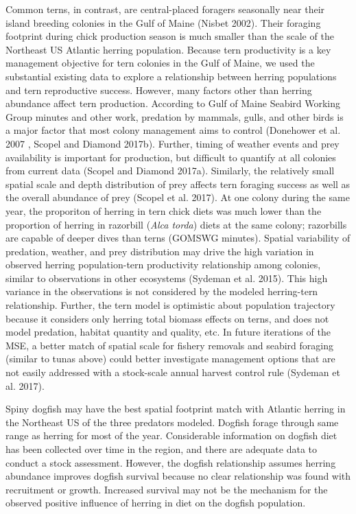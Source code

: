 \documentclass[]{article}
\begin{document}
Common terns, in contrast, are central-placed foragers seasonally near
their island breeding colonies in the Gulf of Maine (Nisbet 2002). Their
foraging footprint during chick production season is much smaller than
the scale of the Northeast US Atlantic herring population. Because tern
productivity is a key management objective for tern colonies in the Gulf
of Maine, we used the substantial existing data to explore a
relationship between herring populations and tern reproductive success.
However, many factors other than herring abundance affect tern
production. According to Gulf of Maine Seabird Working Group minutes and
other work, predation by mammals, gulls, and other birds is a major
factor that most colony management aims to control (Donehower et al.
2007 , Scopel and Diamond 2017b). Further, timing of weather events and
prey availability is important for production, but difficult to quantify
at all colonies from current data (Scopel and Diamond 2017a). Similarly,
the relatively small spatial scale and depth distribution of prey
affects tern foraging success as well as the overall abundance of prey
(Scopel et al. 2017). At one colony during the same year, the proporiton
of herring in tern chick diets was much lower than the proportion of
herring in razorbill (\emph{Alca torda}) diets at the same colony;
razorbills are capable of deeper dives than terns (GOMSWG minutes).
Spatial variability of predation, weather, and prey distribution may
drive the high variation in observed herring population-tern
productivity relationship among colonies, similar to observations in
other ecosystems (Sydeman et al. 2015). This high variance in the
observations is not considered by the modeled herring-tern relationship.
Further, the tern model is optimistic about population trajectory
because it considers only herring total biomass effects on terns, and
does not model predation, habitat quantity and quality, etc. In future
iterations of the MSE, a better match of spatial scale for fishery
removals and seabird foraging (similar to tunas above) could better
investigate management options that are not easily addressed with a
stock-scale annual harvest control rule (Sydeman et al. 2017).

Spiny dogfish may have the best spatial footprint match with Atlantic
herring in the Northeast US of the three predators modeled. Dogfish
forage through same range as herring for most of the year. Considerable
information on dogfish diet has been collected over time in the region,
and there are adequate data to conduct a stock assessment. However, the
dogfish relationship assumes herring abundance improves dogfish survival
because no clear relationship was found with recruitment or growth.
Increased survival may not be the mechanism for the observed positive
influence of herring in diet on the dogfish population.
\end{document}
